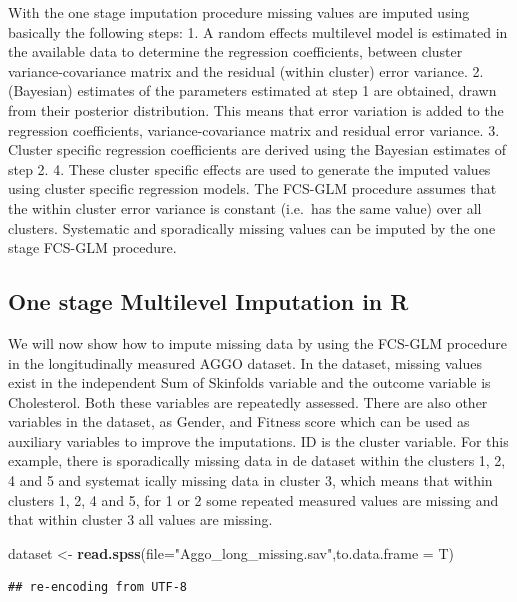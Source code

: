 \documentclass[]{book}
\newenvironment{Shaded}{\begin{snugshade}}{\end{snugshade}}
\newcommand{\KeywordTok}[1]{\textcolor[rgb]{0.13,0.29,0.53}{\textbf{#1}}}
\newcommand{\DataTypeTok}[1]{\textcolor[rgb]{0.13,0.29,0.53}{#1}}
\newcommand{\StringTok}[1]{\textcolor[rgb]{0.31,0.60,0.02}{#1}}
\newcommand{\NormalTok}[1]{#1}
\begin{document}
With the one stage imputation procedure missing values are imputed using
basically the following steps: 1. A random effects multilevel model is
estimated in the available data to determine the regression
coefficients, between cluster variance-covariance matrix and the
residual (within cluster) error variance. 2. (Bayesian) estimates of the
parameters estimated at step 1 are obtained, drawn from their posterior
distribution. This means that error variation is added to the regression
coefficients, variance-covariance matrix and residual error variance. 3.
Cluster specific regression coefficients are derived using the Bayesian
estimates of step 2. 4. These cluster specific effects are used to
generate the imputed values using cluster specific regression models.
The FCS-GLM procedure assumes that the within cluster error variance is
constant (i.e.~has the same value) over all clusters. Systematic and
sporadically missing values can be imputed by the one stage FCS-GLM
procedure.

\subsection{One stage Multilevel Imputation in
R}\label{one-stage-multilevel-imputation-in-r-1}

We will now show how to impute missing data by using the FCS-GLM
procedure in the longitudinally measured AGGO dataset. In the dataset,
missing values exist in the independent Sum of Skinfolds variable and
the outcome variable is Cholesterol. Both these variables are repeatedly
assessed. There are also other variables in the dataset, as Gender, and
Fitness score which can be used as auxiliary variables to improve the
imputations. ID is the cluster variable. For this example, there is
sporadically missing data in de dataset within the clusters 1, 2, 4 and
5 and systemat ically missing data in cluster 3, which means that within
clusters 1, 2, 4 and 5, for 1 or 2 some repeated measured values are
missing and that within cluster 3 all values are missing.

\begin{Shaded}
\begin{Highlighting}[]
\NormalTok{dataset <-}\StringTok{ }\KeywordTok{read.spss}\NormalTok{(}\DataTypeTok{file=}\StringTok{"Aggo_long_missing.sav"}\NormalTok{,}\DataTypeTok{to.data.frame =}\NormalTok{ T)}
\end{Highlighting}
\end{Shaded}

\begin{verbatim}
## re-encoding from UTF-8
\end{verbatim}
\end{document}
